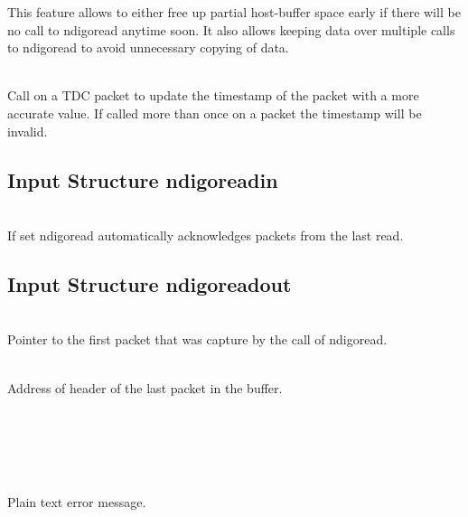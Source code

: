         This feature allows to either free up partial host-buffer space early if there will be no call to \textsf{ndigo\tu read} anytime soon. It also allows keeping data over multiple calls to \textsf{ndigo\tu read} to avoid unnecessary copying of data.\par

         \\
        Call on a TDC packet to update the timestamp of the packet with a more accurate value. If called more than once on a packet the timestamp will be invalid.

        \subsection{Input Structure ndigo\tu read\tu in}

            \\
            If set \textsf{ndigo\tu read} automatically acknowledges packets from the last read.

        \subsection{Input Structure ndigo\tu read\tu out}

            \\
            Pointer to the first packet that was capture by the call of \textsf{ndigo\tu read}.\par

            \\
            Address of header of the last packet in the buffer.\par

            \\
            \\
            \\
            \par

            \\
            Plain text error message.

    \newpage

